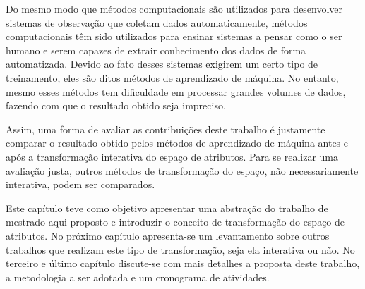 Do mesmo modo que métodos computacionais são utilizados para
desenvolver sistemas de observação que coletam dados
automaticamente, métodos computacionais têm sido utilizados para
ensinar sistemas a pensar como o ser humano e serem capazes
de extrair conhecimento dos dados de forma automatizada.
Devido ao fato desses sistemas exigirem um certo tipo de
treinamento, eles são ditos métodos de aprendizado de
máquina. No entanto, mesmo esses métodos tem
dificuldade em processar grandes volumes de dados, fazendo
com que o resultado obtido seja impreciso.

Assim, uma forma de avaliar as contribuições deste trabalho
é justamente comparar o resultado obtido pelos métodos de
aprendizado de máquina antes e após a transformação
interativa do espaço de atributos. Para se realizar uma
avaliação justa, outros métodos de transformação do espaço,
não necessariamente interativa, podem ser comparados.

Este capítulo teve como objetivo apresentar uma abstração do
trabalho de mestrado aqui proposto e introduzir o conceito
de transformação do espaço de atributos. No próximo capítulo
apresenta-se um levantamento sobre outros trabalhos que
realizam este tipo de transformação, seja ela interativa ou
não. No terceiro e último capítulo discute-se com mais
detalhes a proposta deste trabalho, a metodologia a ser
adotada e um cronograma de atividades.
